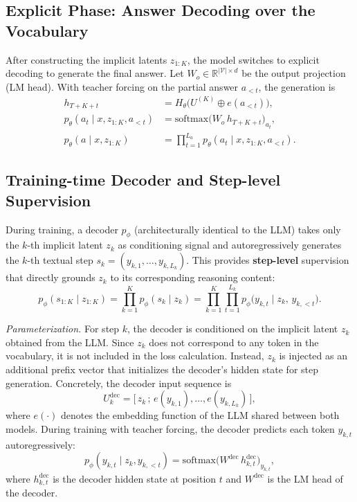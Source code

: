 \subsection{Explicit Phase: Answer Decoding over the Vocabulary}
After constructing the implicit latents \(z_{1:K}\), the model switches to explicit decoding to generate the final answer. 
Let \(W_o\in\mathbb{R}^{|\mathcal{V}|\times d}\) be the output projection (LM head). 
With teacher forcing on the partial answer \(a_{<t}\), the generation is
\begin{align}
h_{T+K+t} &= H_\theta\!\big(U^{(K)} \oplus e(a_{<t})\big), \\
p_\theta(a_t \mid x, z_{1:K}, a_{<t}) &= \mathrm{softmax}\!\big(W_o\, h_{T+K+t}\big)_{a_t}, \\
p_\theta(a \mid x, z_{1:K}) &= \prod_{t=1}^{L_a} p_\theta(a_t \mid x, z_{1:K}, a_{<t}).
\label{eq:explicit}
\end{align}

\subsection{Training-time Decoder and Step-level Supervision}
During training, a decoder $p_\phi$ (architecturally identical to the LLM) takes only the
$k$-th implicit latent $z_k$ as conditioning signal and autoregressively generates the
$k$-th textual step $s_k=(y_{k,1},\ldots,y_{k,L_k})$. This provides \textbf{step-level}
supervision that directly grounds $z_k$ to its corresponding reasoning content:
\begin{equation}
\label{eq:decoder-factor}
p_\phi(s_{1:K} \mid z_{1:K})
= \prod_{k=1}^{K} p_\phi(s_k \mid z_k)
= \prod_{k=1}^{K} \prod_{t=1}^{L_k}
     p_\phi\!\big(y_{k,t} \mid z_k,\, y_{k,<t}\big).
\end{equation}

\noindent\textit{Parameterization.}
For step $k$, the decoder is conditioned on the implicit latent $z_k$ obtained from the LLM.  
Since $z_k$ does not correspond to any token in the vocabulary, it is not included in the loss calculation.  
Instead, $z_k$ is injected as an additional prefix vector that initializes the decoder’s hidden state for step generation.
Concretely, the decoder input sequence is
\[
U^{\text{dec}}_k = \big[\, z_k \,;\, e(y_{k,1}), \ldots, e(y_{k,L_k}) \,\big],
\]
where $e(\cdot)$ denotes the embedding function of the LLM shared between both models.  
During training with teacher forcing, the decoder predicts each token $y_{k,t}$ autoregressively:
\[
p_\phi(y_{k,t} \mid z_k, y_{k,<t}) = \mathrm{softmax}\!\big(W^{\text{dec}}\, h^{\text{dec}}_{k,t}\big)_{y_{k,t}},
\]
where $h^{\text{dec}}_{k,t}$ is the decoder hidden state at position $t$ and $W^{\text{dec}}$ is the LM head of the decoder.  

